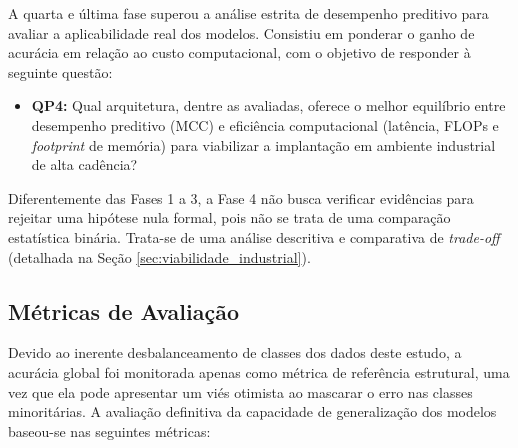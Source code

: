         A quarta e última fase superou a análise estrita de desempenho preditivo para avaliar a aplicabilidade real dos modelos. Consistiu em ponderar o ganho de acurácia em relação ao custo computacional, com o objetivo de responder à seguinte questão:

        \begin{itemize}
            \item\textbf{QP4:} Qual arquitetura, dentre as avaliadas, oferece o melhor equilíbrio entre desempenho preditivo (MCC) e eficiência computacional (latência, FLOPs e \textit{footprint} de memória) para viabilizar a implantação em ambiente industrial de alta cadência?
        \end{itemize}

        Diferentemente das Fases 1 a 3, a Fase 4 não busca verificar evidências para rejeitar uma hipótese nula formal, pois não se trata de uma comparação estatística binária. Trata-se de uma análise descritiva e comparativa de \textit{trade-off} (detalhada na Seção \ref{sec:viabilidade_industrial}).


\subsection{Métricas de Avaliação}

    Devido ao inerente desbalanceamento de classes dos dados deste estudo, a acurácia global foi monitorada apenas como métrica de referência estrutural, uma vez que ela pode apresentar um viés otimista ao mascarar o erro nas classes minoritárias. A avaliação definitiva da capacidade de generalização dos modelos baseou-se nas seguintes métricas:

